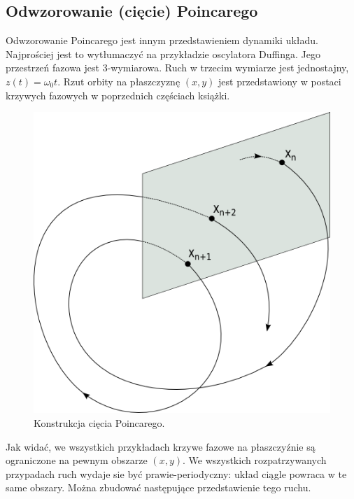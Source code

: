\documentclass[a4paper,12pt,polish]{sphinxmanual}
\begin{document}
\subsection{Odwzorowanie (cięcie) Poincarego}
\label{ch2/chII012:odwzorowanie-ciecie-poincarego}
Odwzorowanie Poincarego jest innym przedstawieniem dynamiki układu.  Najprościej jest to wytłumaczyć na przykładzie oscylatora Duffinga. Jego przestrzeń fazowa jest 3-wymiarowa. Ruch w trzecim wymiarze jest jednostajny, $z(t) = \omega_0 t$. Rzut orbity na płaszczyznę  $(x, y)$ jest przedstawiony w postaci krzywych fazowych w poprzednich częściach książki.
\begin{figure}[htbp]
\centering
\capstart

\includegraphics{poincare_section.png}
\caption{Konstrukcja cięcia Poincarego.}\end{figure}

Jak widać, we wszystkich przykładach krzywe fazowe na płaszczyźnie są ograniczone na pewnym obszarze $(x, y)$. We wszystkich rozpatrzywanych przypadach ruch wydaje sie być prawie-periodyczny: układ ciągle  powraca w te same obszary. Można zbudować następujące przedstawienie tego ruchu.
\end{document}
